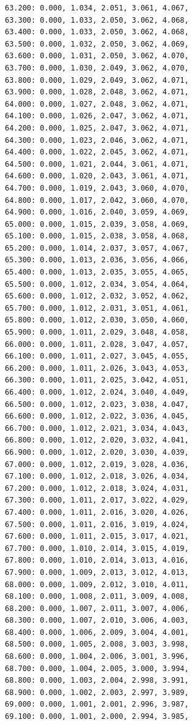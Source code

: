 \documentclass[12pt, a4paper]{article}
\begin{document}
\begin{scriptsize}
\begin{ttfamily}
\begin{lstlisting}
63.200: 0.000, 1.034, 2.051, 3.061, 4.067, 
63.300: 0.000, 1.033, 2.050, 3.062, 4.068, 
63.400: 0.000, 1.033, 2.050, 3.062, 4.068, 
63.500: 0.000, 1.032, 2.050, 3.062, 4.069, 
63.600: 0.000, 1.031, 2.050, 3.062, 4.070, 
63.700: 0.000, 1.030, 2.049, 3.062, 4.070, 
63.800: 0.000, 1.029, 2.049, 3.062, 4.071, 
63.900: 0.000, 1.028, 2.048, 3.062, 4.071, 
64.000: 0.000, 1.027, 2.048, 3.062, 4.071, 
64.100: 0.000, 1.026, 2.047, 3.062, 4.071, 
64.200: 0.000, 1.025, 2.047, 3.062, 4.071, 
64.300: 0.000, 1.023, 2.046, 3.062, 4.071, 
64.400: 0.000, 1.022, 2.045, 3.062, 4.071, 
64.500: 0.000, 1.021, 2.044, 3.061, 4.071, 
64.600: 0.000, 1.020, 2.043, 3.061, 4.071, 
64.700: 0.000, 1.019, 2.043, 3.060, 4.070, 
64.800: 0.000, 1.017, 2.042, 3.060, 4.070, 
64.900: 0.000, 1.016, 2.040, 3.059, 4.069, 
65.000: 0.000, 1.015, 2.039, 3.058, 4.069, 
65.100: 0.000, 1.015, 2.038, 3.058, 4.068, 
65.200: 0.000, 1.014, 2.037, 3.057, 4.067, 
65.300: 0.000, 1.013, 2.036, 3.056, 4.066, 
65.400: 0.000, 1.013, 2.035, 3.055, 4.065, 
65.500: 0.000, 1.012, 2.034, 3.054, 4.064, 
65.600: 0.000, 1.012, 2.032, 3.052, 4.062, 
65.700: 0.000, 1.012, 2.031, 3.051, 4.061, 
65.800: 0.000, 1.012, 2.030, 3.050, 4.060, 
65.900: 0.000, 1.011, 2.029, 3.048, 4.058, 
66.000: 0.000, 1.011, 2.028, 3.047, 4.057, 
66.100: 0.000, 1.011, 2.027, 3.045, 4.055, 
66.200: 0.000, 1.011, 2.026, 3.043, 4.053, 
66.300: 0.000, 1.011, 2.025, 3.042, 4.051, 
66.400: 0.000, 1.012, 2.024, 3.040, 4.049, 
66.500: 0.000, 1.012, 2.023, 3.038, 4.047, 
66.600: 0.000, 1.012, 2.022, 3.036, 4.045, 
66.700: 0.000, 1.012, 2.021, 3.034, 4.043, 
66.800: 0.000, 1.012, 2.020, 3.032, 4.041, 
66.900: 0.000, 1.012, 2.020, 3.030, 4.039, 
67.000: 0.000, 1.012, 2.019, 3.028, 4.036, 
67.100: 0.000, 1.012, 2.018, 3.026, 4.034, 
67.200: 0.000, 1.012, 2.018, 3.024, 4.031, 
67.300: 0.000, 1.011, 2.017, 3.022, 4.029, 
67.400: 0.000, 1.011, 2.016, 3.020, 4.026, 
67.500: 0.000, 1.011, 2.016, 3.019, 4.024, 
67.600: 0.000, 1.011, 2.015, 3.017, 4.021, 
67.700: 0.000, 1.010, 2.014, 3.015, 4.019, 
67.800: 0.000, 1.010, 2.014, 3.013, 4.016, 
67.900: 0.000, 1.009, 2.013, 3.012, 4.013, 
68.000: 0.000, 1.009, 2.012, 3.010, 4.011, 
68.100: 0.000, 1.008, 2.011, 3.009, 4.008, 
68.200: 0.000, 1.007, 2.011, 3.007, 4.006, 
68.300: 0.000, 1.007, 2.010, 3.006, 4.003, 
68.400: 0.000, 1.006, 2.009, 3.004, 4.001, 
68.500: 0.000, 1.005, 2.008, 3.003, 3.998, 
68.600: 0.000, 1.004, 2.006, 3.001, 3.996, 
68.700: 0.000, 1.004, 2.005, 3.000, 3.994, 
68.800: 0.000, 1.003, 2.004, 2.998, 3.991, 
68.900: 0.000, 1.002, 2.003, 2.997, 3.989, 
69.000: 0.000, 1.001, 2.001, 2.996, 3.987, 
69.100: 0.000, 1.001, 2.000, 2.994, 3.985, 

\end{lstlisting}
\end{ttfamily}
\end{scriptsize}
\end{document}
